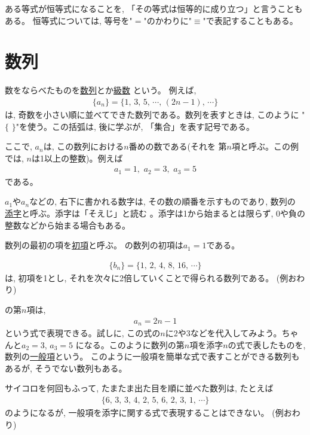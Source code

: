 ある等式が恒等式になることを, 「その等式は恒等的に成り立つ」と言うこともある。
恒等式については, 等号を"$=$"のかわりに"$\equiv$"で表記することもある。
\mv

\begin{freqmiss}{\small{}}\end{freqmiss}
\mv


\section{数列}\label{sec:suuretsu}

数をならべたものを\underline{数列}とか\underline{級数}
という。
例えば, 
\begin{eqnarray}
\{a_n\}=\{1,\,3,\,5,\,\cdots,\,(2n-1),\,\cdots\}\label{eq:ex_series_odd}
\end{eqnarray}
は, 奇数を小さい順に並べてできた数列である。数列を表すときは, このように
"$\{\,\,\}$"を使う。この括弧は, 後に学ぶが, 「集合」を表す記号である。

ここで, $a_n$は, この数列における$n$番めの数である(それを
第$n$項と呼ぶ。この例では, $n$は1以上の整数)。例えば
\begin{eqnarray}a_1=1,\,\, a_2=3,\,\, a_3=5\end{eqnarray}
である。

$a_1$や$a_n$などの, 右下に書かれる数字は, その数の順番を示すものであり, 数列の
\underline{添字}と呼ぶ。添字は「そえじ」と読む
。添字は1から始まるとは限らず, 0や負の整数などから始まる場合もある。

数列の最初の項を\underline{初項}と呼ぶ。
の数列の初項は$a_1=1$である。

\begin{exmpl}
\begin{eqnarray}
\{b_n\}=\{1,\, 2,\, 4,\, 8,\, 16,\, \cdots\}\label{eq:ex_series_touhi2}
\end{eqnarray}
は, 初項を1とし, それを次々に2倍していくことで得られる数列である。
(例おわり)\end{exmpl}

の第$n$項は, 
\begin{eqnarray}
a_n=2n-1
\end{eqnarray}
という式で表現できる。試しに, この式の$n$に2や3などを代入してみよう。ちゃんと$a_2=3$, $a_3=5$
になる。このように数列の第$n$項を添字$n$の式で表したものを, 
数列の\underline{一般項}という。
このように一般項を簡単な式で表すことができる数列もあるが, そうでない数列もある。
\begin{exmpl}
サイコロを何回もふって, たまたま出た目を順に並べた数列は, たとえば
\begin{eqnarray}
\{6,\, 3,\, 3,\, 4,\, 2,\, 5,\, 6,\, 2,\, 3,\, 1,\, \cdots\}
\end{eqnarray}
のようになるが, 一般項を添字に関する式で表現することはできない。
(例おわり)\end{exmpl}


